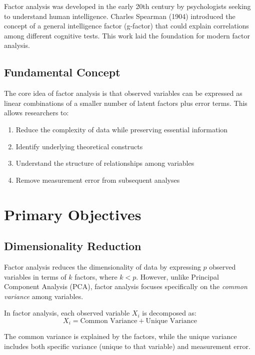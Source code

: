 \documentclass[a4paper]{tufte-book}
\begin{document}
Factor analysis was developed in the early 20th century by psychologists seeking to understand human intelligence. Charles Spearman (1904) introduced the concept of a general intelligence factor (g-factor) that could explain correlations among different cognitive tests. This work laid the foundation for modern factor analysis.

\subsection{Fundamental Concept}

The core idea of factor analysis is that observed variables can be expressed as linear combinations of a smaller number of latent factors plus error terms. This allows researchers to:

\begin{enumerate}
\item Reduce the complexity of data while preserving essential information
\item Identify underlying theoretical constructs
\item Understand the structure of relationships among variables
\item Remove measurement error from subsequent analyses
\end{enumerate}

\section{Primary Objectives}

\subsection{Dimensionality Reduction}

Factor analysis reduces the dimensionality of data by expressing $p$ observed variables in terms of $k$ factors, where $k < p$. However, unlike Principal Component Analysis (PCA), factor analysis focuses specifically on the \textit{common variance} among variables.


\begin{mathconcept}
In factor analysis, each observed variable $X_i$ is decomposed as:
$$X_i = \text{Common Variance} + \text{Unique Variance}$$

The common variance is explained by the factors, while the unique variance includes both specific variance (unique to that variable) and measurement error.
\end{mathconcept}
\end{document}
